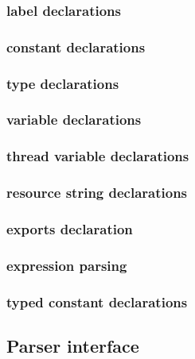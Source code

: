 \documentclass [a4paper,12pt]{article}
\begin{document}
\subsubsection{label declarations }
\label{subsubsec:mylabel13}

\subsubsection{constant declarations}
\label{subsubsec:mylabel14}

\subsubsection{type declarations}
\label{subsubsec:mylabel15}

\subsubsection{variable declarations}
\label{subsubsec:mylabel16}

\subsubsection{thread variable declarations}
\label{subsubsec:thread}

\subsubsection{resource string declarations}
\label{subsubsec:resource}

\subsubsection{exports declaration}
\label{subsubsec:exports}

\subsubsection{expression parsing }
\label{subsubsec:expression}

\subsubsection{typed constant declarations}
\label{subsubsec:mylabel17}

\subsection{Parser interface}
\label{subsec:parser}
\end{document}
